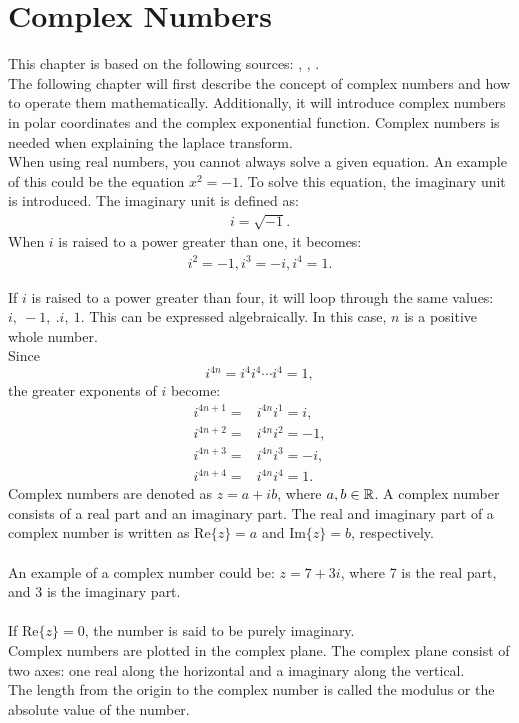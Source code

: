 \chapter{Complex Numbers}
This chapter is based on the following sources: \cite{complexpaul}, \cite{complexpurple}, \cite{complexnotebook}.\\

\noindent The following chapter will first describe the concept of complex numbers and how to operate them mathematically. Additionally, it will introduce complex numbers in polar coordinates and the complex exponential function. Complex numbers is needed when explaining the laplace transform.
\\

\noindent When using real numbers, you cannot always solve a given equation. An example of this could be the equation $x^2=-1$. To solve this equation, the imaginary unit is introduced. The imaginary unit is defined as:
\begin{align*}
i=\sqrt{-1}.
\end{align*}
When $i$ is raised to a power greater than one, it becomes:
\begin{align*}
i^2=-1, i^3=-i, i^4=1.
\end{align*}

\noindent If $i$ is raised to a power greater than four, it will loop through the same values: $i, \ -1, \ .i, \ 1$. This can be expressed algebraically. In this case, $n$ is a  positive whole number. 
\\
Since $$i^{4n} = i^4i^4\cdots i^4 = 1,$$
the greater exponents of $i$ become:
\begin{align*}
	i^{4n+1} =& i^{4n}i^1 = i, \\
	i^{4n+2} =& i^{4n}i^2 = -1, \\
	i^{4n+3} =& i^{4n}i^3 = -i, \\
	i^{4n+4} =& i^{4n}i^4 = 1.
\end{align*}
Complex numbers are denoted as $z = a+ib$, where $a,b\in \mathbb{R}$. A complex number consists of a real part and an imaginary part. The real and imaginary part of a complex number is written as $\text{Re}\{z\}=a$ and $\text{Im}\{z\}=b$, respectively.
\\
\\
An example of a complex number could be: $z=7+3i$, where 7 is the real part, and 3 is the imaginary part. 
\\
\\
If $\text{Re}\{z\}=0$, the number is said to be purely imaginary.  
\\
Complex numbers are plotted in the complex plane. The complex plane consist of two axes: one real along the horizontal and a imaginary along the vertical.\\
The length from the origin to the complex number is called the modulus or the absolute value of the number.

